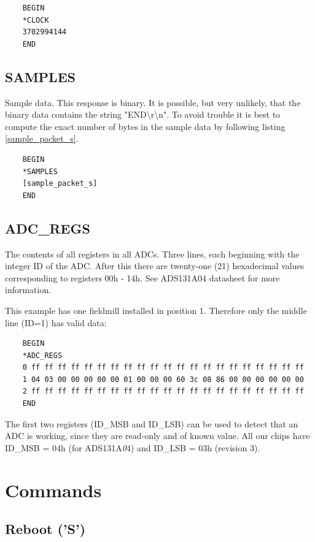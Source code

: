 \documentclass{article}
\begin{document}
\begin{lstlisting}
    BEGIN
    *CLOCK
    3702994144
    END
\end{lstlisting}

\subsection{SAMPLES}

Sample data.
This response is binary.
It is possible, but very unlikely, that the binary data contains the string "END{\textbackslash}r{\textbackslash}n".
To avoid trouble it is best to compute the exact number of bytes in the sample data by following listing \vref{sample_packet_s}.

\begin{lstlisting}
    BEGIN
    *SAMPLES
    [sample_packet_s]
    END
\end{lstlisting}

\subsection{ADC\_REGS}

The contents of all registers in all ADCs.
Three lines, each beginning with the integer ID of the ADC.
After this there are twenty-one (21) hexadecimal values corresponding to registers 00h - 14h.
See ADS131A04 datasheet for more information.

This example has one fieldmill installed in position 1.
Therefore only the middle line (ID=1) has valid data:

\begin{lstlisting}
    BEGIN
    *ADC_REGS
    0 ff ff ff ff ff ff ff ff ff ff ff ff ff ff ff ff ff ff ff ff ff
    1 04 03 00 00 00 00 00 01 00 00 00 60 3c 08 86 00 00 00 00 00 00
    2 ff ff ff ff ff ff ff ff ff ff ff ff ff ff ff ff ff ff ff ff ff
    END
\end{lstlisting}

The first two registers (ID\_MSB and ID\_LSB) can be used to detect that an ADC is working,
since they are read-only and of known value.
All our chips have ID\_MSB = 04h (for ADS131A{\emph 04}) and ID\_LSB = 03h (revision 3).

\section{Commands}

\subsection{Reboot ('S')}
\end{document}
